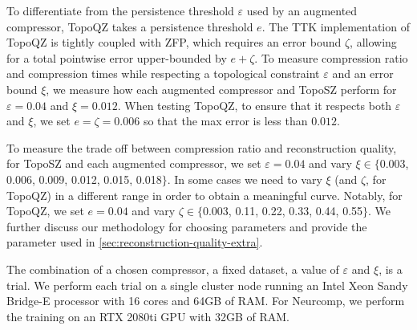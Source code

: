 To differentiate from the persistence threshold $\varepsilon$ used by an augmented compressor, TopoQZ takes a persistence threshold $e$. The TTK implementation of TopoQZ is tightly coupled with ZFP, which requires an error bound $\zeta$, allowing for a total pointwise error upper-bounded by $e+\zeta$.
To measure compression ratio and compression times while respecting a topological constraint $\varepsilon$ and an error bound $\xi$, we measure how each augmented compressor and TopoSZ perform for $\varepsilon = 0.04$ and $\xi = 0.012$. When testing TopoQZ, to ensure that it respects both $\varepsilon$ and $\xi$, we set $e = \zeta = 0.006$ so that the max error is less than $0.012$.

To measure the trade off between compression ratio and reconstruction quality, for TopoSZ and each augmented compressor, we set $\varepsilon = 0.04$ and vary $\xi \in \{$0.003, 0.006, 0.009, 0.012, 0.015, 0.018$\}$. In some cases we need to vary $\xi$ (and $\zeta$, for TopoQZ) in a different range in order to obtain a meaningful curve. Notably, for TopoQZ, we set $e = 0.04$ and vary $\zeta \in \{$0.003, 0.11, 0.22, 0.33, 0.44, 0.55$\}$. We further discuss our methodology for choosing parameters and provide the parameter used in \cref{sec:reconstruction-quality-extra}. 

The combination of a chosen compressor, a fixed dataset, a value of $\varepsilon$ and $\xi$, is a trial.
We perform each trial on a single cluster node running an Intel Xeon Sandy Bridge-E processor with 16 cores and 64GB of RAM.
For Neurcomp, we perform the training on an RTX 2080ti GPU with 32GB of RAM.

